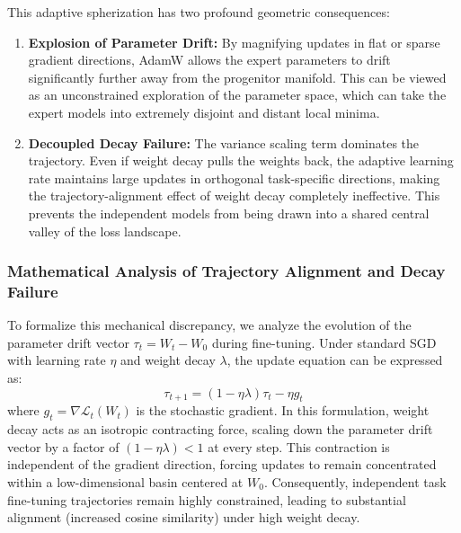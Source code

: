 \documentclass{article}
\theoremstyle{plain}
\theoremstyle{definition}
\theoremstyle{remark}
\begin{document}
This adaptive spherization has two profound geometric consequences:
\begin{enumerate}
    \item \textbf{Explosion of Parameter Drift:} By magnifying updates in flat or sparse gradient directions, AdamW allows the expert parameters to drift significantly further away from the progenitor manifold. This can be viewed as an unconstrained exploration of the parameter space, which can take the expert models into extremely disjoint and distant local minima.
    \item \textbf{Decoupled Decay Failure:} The variance scaling term dominates the trajectory. Even if weight decay pulls the weights back, the adaptive learning rate maintains large updates in orthogonal task-specific directions, making the trajectory-alignment effect of weight decay completely ineffective. This prevents the independent models from being drawn into a shared central valley of the loss landscape.
\end{enumerate}

\subsubsection{Mathematical Analysis of Trajectory Alignment and Decay Failure}
To formalize this mechanical discrepancy, we analyze the evolution of the parameter drift vector $\tau_t = W_t - W_0$ during fine-tuning. Under standard SGD with learning rate $\eta$ and weight decay $\lambda$, the update equation can be expressed as:
\begin{equation}
    \tau_{t+1} = (1 - \eta \lambda) \tau_t - \eta g_t
\end{equation}
where $g_t = \nabla \mathcal{L}_t(W_t)$ is the stochastic gradient. In this formulation, weight decay acts as an isotropic contracting force, scaling down the parameter drift vector by a factor of $(1 - \eta \lambda) < 1$ at every step. This contraction is independent of the gradient direction, forcing updates to remain concentrated within a low-dimensional basin centered at $W_0$. Consequently, independent task fine-tuning trajectories remain highly constrained, leading to substantial alignment (increased cosine similarity) under high weight decay.
\end{document}
